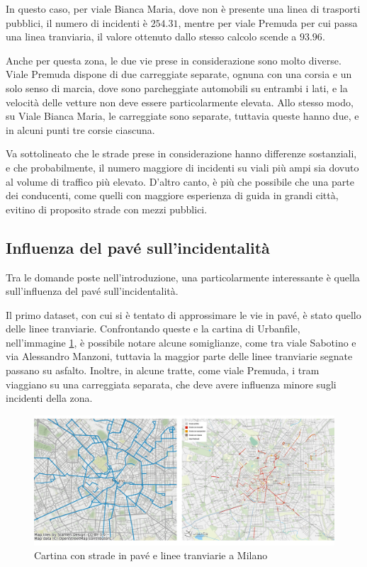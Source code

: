 \documentclass[a4paper]{report}
\begin{document}
In questo caso, per viale Bianca Maria, dove non è presente una linea di trasporti pubblici, 
il numero di incidenti è $254.31$, mentre per viale Premuda per cui passa una linea tranviaria, 
il valore ottenuto dallo stesso calcolo scende a $93.96$. 

Anche per questa zona, le due vie prese in considerazione sono molto diverse. 
Viale Premuda dispone di due carreggiate separate, ognuna con una corsia e un solo senso 
di marcia, dove sono parcheggiate automobili su entrambi i lati, e la velocità delle 
vetture non deve essere particolarmente elevata. 
Allo stesso modo, su Viale Bianca Maria, le carreggiate sono separate, tuttavia queste 
hanno due, e in alcuni punti tre corsie ciascuna. 

Va sottolineato che le strade prese in considerazione hanno differenze sostanziali, 
e che probabilmente, il numero maggiore di incidenti su viali più ampi sia dovuto al 
volume di traffico più elevato. 
D'altro canto, è più che possibile che una parte dei conducenti, 
come quelli con maggiore esperienza di guida in grandi città, evitino di proposito 
strade con mezzi pubblici.


\subsection{Influenza del pavé sull'incidentalità}

Tra le domande poste nell'introduzione, una particolarmente interessante è quella 
sull'influenza del pavé sull'incidentalità. 

Il primo dataset, con cui si è tentato di approssimare le vie in pavé, è stato quello 
delle linee tranviarie. 
Confrontando queste e la cartina di Urbanfile, nell'immagine \ref{fig:tram-pave-milano}, 
è possibile notare alcune somiglianze, come tra viale Sabotino e via 
Alessandro Manzoni, tuttavia la maggior parte delle linee tranviarie segnate 
passano su asfalto. 
Inoltre, in alcune tratte, come viale Premuda, i tram viaggiano su una carreggiata separata, 
che deve avere influenza minore sugli incidenti della zona. 

\begin{figure}
    \includegraphics[width=\linewidth]{../src/tram/tram_milano.png}
    \caption{Cartina con strade in pavé e linee tranviarie a Milano}
    \label{fig:tram-pave-milano}
\end{figure}
\end{document}
